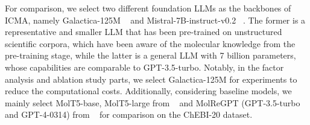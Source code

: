 For comparison, we select two different foundation LLMs as the backbones of ICMA, namely Galactica-125M ~\cite{taylor2022galactica} and Mistral-7B-instruct-v0.2 ~\cite{jiang2023mistral}. The former is a representative and smaller LLM that has been pre-trained on unstructured scientific corpora, which have been aware of the molecular knowledge from the pre-training stage, while the latter is a general LLM with 7 billion parameters, whose capabilities are comparable to GPT-3.5-turbo.
Notably, in the factor analysis and ablation study parts, we select Galactica-125M for experiments to reduce the computational costs.
Additionally, considering baseline models, we mainly select MolT5-base, MolT5-large from ~\citet{edwards-etal-2022-translation} and MolReGPT (GPT-3.5-turbo and GPT-4-0314) from ~\citet{li2023empowering} for comparison on the ChEBI-20 dataset.

